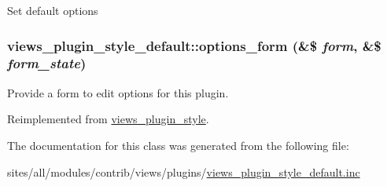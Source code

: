 Set default options \hypertarget{classviews__plugin__style__default_6d6eb45c613c5990a44b3071cb82b36d}{
\subsubsection[{options\_\-form}]{\setlength{\rightskip}{0pt plus 5cm}views\_\-plugin\_\-style\_\-default::options\_\-form (\&\$ {\em form}, \/  \&\$ {\em form\_\-state})}}
\label{classviews__plugin__style__default_6d6eb45c613c5990a44b3071cb82b36d}


Provide a form to edit options for this plugin. 

Reimplemented from \hyperlink{classviews__plugin__style_fe3d437ff4398315b15c4e60975dbb1c}{views\_\-plugin\_\-style}.

The documentation for this class was generated from the following file:\begin{CompactItemize}
\item 
sites/all/modules/contrib/views/plugins/\hyperlink{views__plugin__style__default_8inc}{views\_\-plugin\_\-style\_\-default.inc}\end{CompactItemize}
